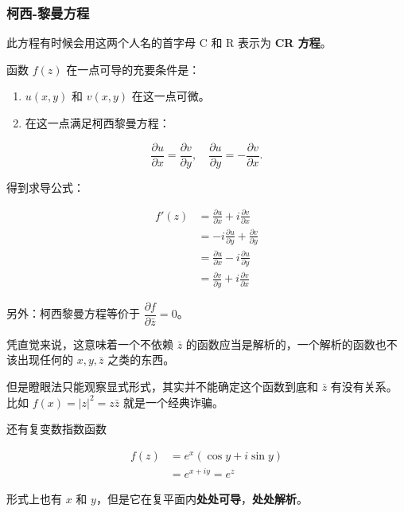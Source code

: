 \subsubsection{柯西-黎曼方程}
\label{柯西-黎曼方程}
此方程有时候会用这两个人名的首字母 C 和 R 表示为 \textbf{CR 方程}。

函数 \(f(z)\) 在一点可导的充要条件是：

\begin{enumerate}
\item \(u(x,y)\) 和 \(v(x,y)\) 在这一点可微。
\item 在这一点满足柯西黎曼方程：
\end{enumerate}

\[
\frac{\partial u}{\partial x} = \frac{\partial v}{\partial y},\quad \frac{\partial u}{\partial y} = -\frac{\partial v}{\partial x}.
\]

得到求导公式：

\begin{equation*}
\begin{aligned}
   f'(z) &= \frac{\partial u}{\partial x}+i\frac{\partial v}{\partial x}\\
   &=-i\frac{\partial u}{\partial y}+\frac{\partial v}{\partial y}\\
   &=\frac{\partial u}{\partial x}-i\frac{\partial u}{\partial y}\\
   &=\frac{\partial v}{\partial y}+i\frac{\partial v}{\partial x}
\end{aligned}
\end{equation*}

\begin{tcolorbox}[title={Note},colback=red!5!white
,colframe=red!75!black
,colbacktitle=yellow!50!red
,coltitle=red!25!black, fonttitle=\bfseries,subtitle style={boxrule=0.4pt, colback=yellow!50!red!25!white}]
另外：柯西黎曼方程等价于
\(\dfrac{\partial f}{\partial \bar{z}}=0\)。

凭直觉来说，这意味着一个不依赖 \(\bar{z}\) 的函数应当是解析的，一个解析的函数也不该出现任何的 \(x,y,\bar{z}\) 之类的东西。

但是瞪眼法只能观察显式形式，其实并不能确定这个函数到底和 \(\bar{z}\) 有没有关系。比如 \(f(x)=|z|^2=z\bar{z}\) 就是一个经典诈骗。

还有复变数指数函数

\begin{equation*}
\begin{aligned}
    f(z)&=e^x(\cos y+i\sin y)\\
    &=e^{x+iy}=e^z
\end{aligned}
\end{equation*}

形式上也有 \(x\) 和 \(y\)，但是它在复平面内\textbf{处处可导}，\textbf{处处解析}。

\end{tcolorbox}
